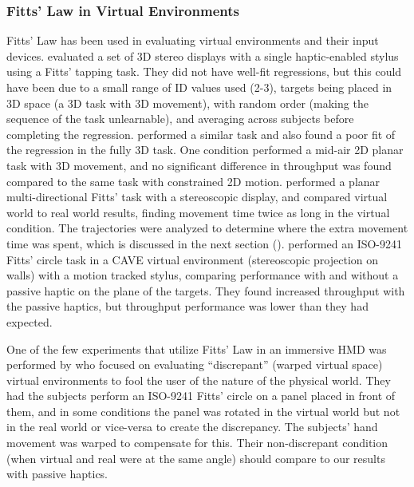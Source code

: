 \subsubsection{Fitts' Law in Virtual Environments}\label{applying-fitts-to-virtual-environment}

Fitts' Law has been used in evaluating virtual environments and their input devices.
\citet{chun_evaluating_2004} evaluated a set of 3D stereo displays with a single haptic-enabled stylus using a Fitts' tapping task.
They did not have well-fit regressions, but this could have been due to a small range of ID values used (2-3), targets being placed in 3D space (a 3D task with 3D movement), with random order (making the sequence of the task un\-learn\-able), and averaging across subjects before completing the regression.
\citet{teather_evaluating_2010} performed a similar task and also found a poor fit of the regression in the fully 3D task.
One condition performed a mid-air 2D planar task with 3D movement, and no significant difference in throughput was found compared to the same task with constrained 2D motion.
\citet{liu_comparing_2009} performed a planar multi-directional Fitts' task with a stereoscopic display, and compared virtual world to real world results, finding movement time twice as long in the virtual condition.
The trajectories were analyzed to determine where the extra movement time was spent, which is discussed in the next section ().
\citet{teather_pointing_2011} performed an ISO-9241 Fitts' circle task in a CAVE virtual environment (stereoscopic projection on walls) with a motion tracked stylus, comparing performance with and without a passive haptic on the plane of the targets.
They found increased throughput with the passive haptics, but throughput performance was lower than they had expected.

One of the few experiments that utilize Fitts' Law in an immersive HMD was performed by \citet{kohli_redirected_2012} who focused on evaluating ``discrepant'' (warped virtual space) virtual environments to fool the user of the nature of the physical world.
They had the subjects perform an ISO-9241 Fitts' circle on a panel placed in front of them, and in some conditions the panel was rotated in the virtual world but not in the real world or vice-versa to create the discrepancy.
The subjects' hand movement was warped to compensate for this.
Their non-discrepant condition (when virtual and real were at the same angle) should compare to our results with passive haptics.

